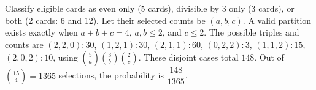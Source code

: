 Classify eligible cards as even only (5 cards), divisible by 3 only (3 cards), or both (2 cards: 6 and 12). Let their selected counts be $(a,b,c)$. A valid partition exists exactly when $a+b+c=4$, $a,b\le2$, and $c\le2$. The possible triples and counts are $(2,2,0):30$, $(1,2,1):30$, $(2,1,1):60$, $(0,2,2):3$, $(1,1,2):15$, $(2,0,2):10$, using $\binom{5}{a}\binom{3}{b}\binom{2}{c}$. These disjoint cases total $148$. Out of $\binom{15}{4}=1365$ selections, the probability is $\boxed{\dfrac{148}{1365}}$.

